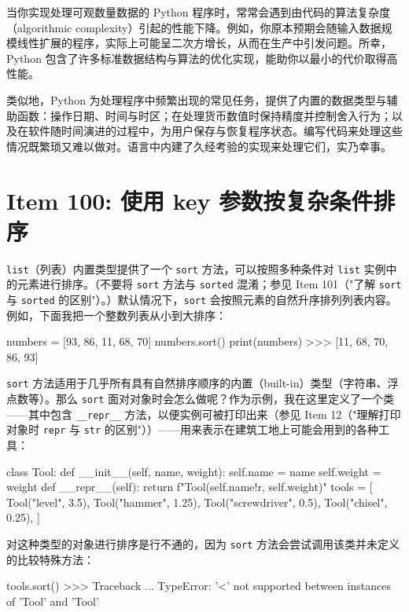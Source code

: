 当你实现处理可观数量数据的 Python 程序时，常常会遇到由代码的算法复杂度（algorithmic complexity）引起的性能下降。例如，你原本预期会随输入数据规模线性扩展的程序，实际上可能呈二次方增长，从而在生产中引发问题。所幸，Python 包含了许多标准数据结构与算法的优化实现，能助你以最小的代价取得高性能。

类似地，Python 为处理程序中频繁出现的常见任务，提供了内置的数据类型与辅助函数：操作日期、时间与时区；在处理货币数值时保持精度并控制舍入行为；以及在软件随时间演进的过程中，为用户保存与恢复程序状态。编写代码来处理这些情况既繁琐又难以做对。语言中内建了久经考验的实现来处理它们，实乃幸事。

\section{Item 100: 使用 key 参数按复杂条件排序}

\texttt{list}（列表）内置类型提供了一个 \texttt{sort} 方法，可以按照多种条件对 \texttt{list} 实例中的元素进行排序。（不要将 \texttt{sort} 方法与 \texttt{sorted} 混淆；参见 Item 101（"了解 \texttt{sort} 与 \texttt{sorted} 的区别"）。）默认情况下，\texttt{sort} 会按照元素的自然升序排列列表内容。例如，下面我把一个整数列表从小到大排序：

\begin{codebox}[python]
numbers = [93, 86, 11, 68, 70]
numbers.sort()
print(numbers)
>>>
[11, 68, 70, 86, 93]
\end{codebox}

\texttt{sort} 方法适用于几乎所有具有自然排序顺序的内置（built-in）类型（字符串、浮点数等）。那么 \texttt{sort} 面对对象时会怎么做呢？作为示例，我在这里定义了一个类——其中包含 \texttt{\_\_repr\_\_} 方法，以便实例可被打印出来（参见 Item 12（"理解打印对象时 \texttt{repr} 与 \texttt{str} 的区别"））——用来表示在建筑工地上可能会用到的各种工具：

\begin{codebox}[python]
class Tool:
    def __init__(self, name, weight):
        self.name = name
        self.weight = weight
    def __repr__(self):
        return f"Tool({self.name!r}, {self.weight})"
tools = [
    Tool("level", 3.5),
    Tool("hammer", 1.25),
    Tool("screwdriver", 0.5),
    Tool("chisel", 0.25),
]
\end{codebox}

对这种类型的对象进行排序是行不通的，因为 \texttt{sort} 方法会尝试调用该类并未定义的比较特殊方法：

\begin{codebox}[python]
tools.sort()
>>>
Traceback ...
TypeError: '<' not supported between instances of 'Tool' and
'Tool'
\end{codebox}

